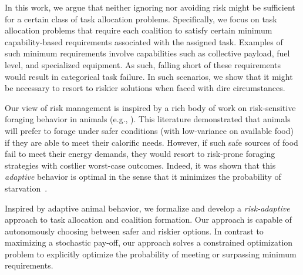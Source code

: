 \documentclass[letterpaper, 10 pt, conference]{ieeeconf}  %
\newcommand{\red}[1]{\color{red} #1 \color{black}}
\newcommand{\blue}[1]{\color{blue} #1 \color{black}}
\begin{document}

In this work, we argue that neither ignoring nor avoiding risk might be sufficient for a certain class of task allocation problems. Specifically, we focus on task allocation problems that require each coalition to satisfy certain minimum capability-based requirements associated with the assigned task. Examples of such minimum requirements involve capabilities such as collective payload, fuel level, and specialized equipment. As such, falling short of these requirements would result in categorical task failure. In such scenarios, we show that it might be necessary to resort to riskier solutions when faced with dire circumstances.

Our view of risk management is inspired by a rich body of work on risk-sensitive foraging behavior in animals (e.g., \cite{caraco_empirical_1980}). This literature demonstrated that animals will prefer to forage under safer conditions (with low-variance on available food) if they are able to meet their calorific needs. However, if such safe sources of food fail to meet their energy demands, they would resort to risk-prone foraging strategies with costlier worst-case outcomes. Indeed, it was shown that this \textit{adaptive} behavior is optimal in the sense that it minimizes the probability of starvation~\cite{stephens_logic_1981}.

Inspired by adaptive animal behavior, we formalize and develop a \textit{risk-adaptive} approach to task allocation and coalition formation. Our approach is capable of autonomously choosing between safer and riskier options. In contrast to maximizing a stochastic pay-off, our approach solves a constrained optimization problem to explicitly optimize the probability of meeting or surpassing minimum requirements. 

\end{document}
